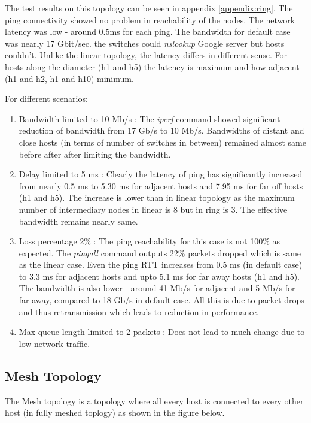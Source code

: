 \documentclass[a4paper, 11pt]{article}
\begin{document}
The test results on this topology can be seen in appendix \ref{appendix:ring}. The ping connectivity showed no problem in reachability of the nodes. The network latency was low - around 0.5ms for each ping. The bandwidth for default case was nearly 17 Gbit/sec. the switches could \textit{nslookup} Google server but hosts couldn't. Unlike the linear topology, the latency differs in different sense. For hosts along the diameter (h1 and h5) the latency is maximum and how adjacent (h1 and h2, h1 and h10) minimum.

For different scenarios:
\begin{enumerate}
\item Bandwidth limited to 10 Mb/s : The \textit{iperf} command showed significant reduction of bandwidth from 17 Gb/s to 10 Mb/s. Bandwidths of distant and close hosts (in terms of number of switches in between) remained almost same before after after limiting the bandwidth.
\item Delay limited to 5 ms : Clearly the latency of ping has significantly increased from nearly 0.5 ms to 5.30 ms for adjacent hosts and 7.95 ms for far off hosts (h1 and h5). The increase is lower than in linear topology as the maximum number of intermediary nodes in linear is 8 but in ring is 3. The effective bandwidth remains nearly same.
\item Loss percentage 2\% : The ping reachability for this case is not 100\% as expected. The \textit{pingall} command outputs 22\% packets dropped which is same as the linear case. Even the ping RTT increases from 0.5 ms (in default case) to 3.3 ms for adjacent hosts and upto 5.1 ms for far away hosts (h1 and h5). The bandwidth is also lower - around 41 Mb/s for adjacent and 5 Mb/s for far away, compared to 18 Gb/s in default case. All this is due to packet drops and thus retransmission which leads to reduction in performance.
\item Max queue length limited to 2 packets : Does not lead to much change due to low network traffic.
\end{enumerate}

\newpage

\subsection{Mesh Topology}

The Mesh topology is a topology where all every host is connected to every other host (in fully meshed toplogy) as shown in the figure below.
\end{document}

